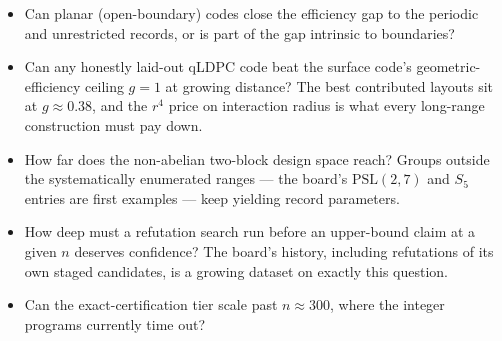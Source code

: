 \documentclass[11pt]{article}
\begin{document}
	\begin{itemize}[nosep]
		\item Can planar (open-boundary) codes close the efficiency gap to
		the periodic and unrestricted records, or is part of the gap
		intrinsic to boundaries?
		\item Can any honestly laid-out qLDPC code beat the surface code's
		geometric-efficiency ceiling $g=1$ at growing distance? The best
		contributed layouts sit at $g\approx0.38$, and the $r^4$ price on
		interaction radius is what every long-range construction must pay
		down.
		\item How far does the non-abelian two-block design space reach?
		Groups outside the systematically enumerated ranges --- the board's
		$\mathrm{PSL}(2,7)$ and $S_5$ entries are first examples --- keep
		yielding record parameters.
		\item How deep must a refutation search run before an upper-bound
		claim at a given $n$ deserves confidence? The board's history,
		including refutations of its own staged candidates, is a growing
		dataset on exactly this question.
		\item Can the exact-certification tier scale past $n\approx 300$,
		where the integer programs currently time out?
	\end{itemize}

	{\small
	
	
	}
\end{document}
